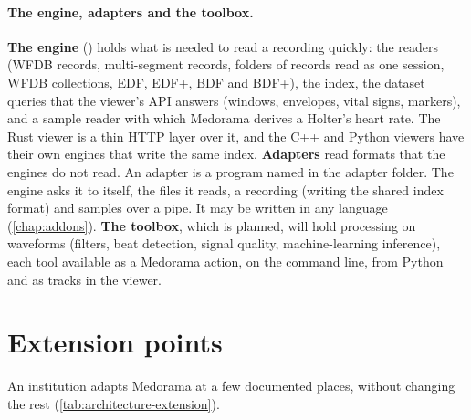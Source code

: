 \paragraph{The engine, adapters and the toolbox.} \textbf{The engine} () holds
what is needed to read a recording quickly: the readers (WFDB records, multi-segment records,
folders of records read as one session, WFDB collections, EDF, EDF+, BDF and BDF+), the index,
the dataset queries that the viewer's API answers (windows, envelopes, vital signs, markers), and
a sample reader with which Medorama derives a Holter's heart rate. The Rust viewer is a thin HTTP
layer over it, and the C++ and Python viewers have their own engines that write the same index.
\textbf{Adapters} read formats that the engines do not read. An adapter is a program named
 in the adapter folder. The engine asks it to  itself,
 the files it reads,  a recording (writing the shared index format) and
 samples over a pipe. It may be written in any language (\cref{chap:addons}). \textbf{The toolbox}, which
is planned, will hold processing on waveforms (filters, beat detection, signal quality,
machine-learning inference), each tool available as a Medorama action, on the command line, from
Python and as tracks in the viewer.

\section{Extension points}
\label{sec:architecture-extension}

An institution adapts Medorama at a few documented places, without changing the rest
(\cref{tab:architecture-extension}).


